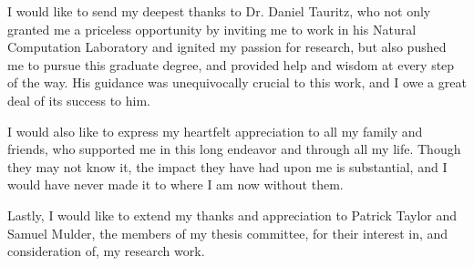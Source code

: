 \documentclass[times,12pt,titlepage]{mstogs}
\begin{document}

\begin{ThesisAcknowledgment}
I would like to send my deepest thanks to Dr. Daniel Tauritz, who not only granted me a priceless opportunity by inviting me to work in his Natural Computation Laboratory and ignited my passion for research, but also pushed me to pursue this graduate degree, and provided help and wisdom at every step of the way. His guidance was unequivocally crucial to this work, and I owe a great deal of its success to him.

I would also like to express my heartfelt appreciation to all my family and friends, who supported me in this long endeavor and through all my life. Though they may not know it, the impact they have had upon me is substantial, and I would have never made it to where I am now without them.

Lastly, I would like to extend my thanks and appreciation to Patrick Taylor and Samuel Mulder, the members of my thesis committee, for their interest in, and consideration of, my research work.

\end{ThesisAcknowledgment}

\begin{ThesisFrontMatter}
\tableofcontents
\listoffigures
\listoftables
\listofsymbols
\end{ThesisFrontMatter}
\end{document}
